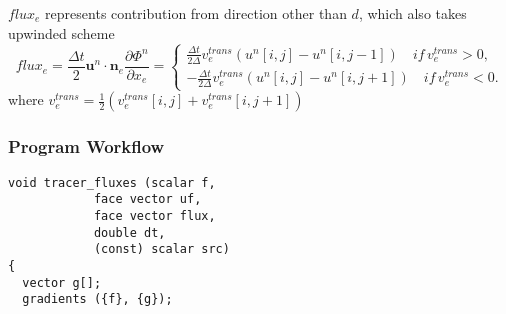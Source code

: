\documentclass[a4paper]{article}
\newcommand{\para}[1]{\textbf{\emph{\textcolor{para}{#1}}}}
\begin{document}
$flux_e$ represents contribution from direction other than $d$, which also takes upwinded scheme
\begin{equation}
    flux_e = \frac{\Delta t}{2} \mathbf{u}^n\cdot\mathbf{n}_e \frac{\partial \Phi^n}{\partial x_e}=\left \{ 
    \begin{array}{cc}
      \frac{\Delta t}{2\Delta} v_{e}^{trans}(u^n[i,j]-u^n[i,j-1])\quad if\,v_{e}^{trans}>0,\\
      -\frac{\Delta t}{2\Delta} v_e^{trans}(u^n[i,j]-u^n[i,j+1])\quad if\,v_e^{trans}<0.
    \end{array}
    \right.
\end{equation}
where $v_e^{trans} = \frac{1}{2}(v_e^{trans}[i,j]+v_e^{trans}[i,j+1])$
\subsubsection{Program Workflow}
\begin{multicols}{2}
 \columnbreak
 \begin{verbatim}
void tracer_fluxes (scalar f,
		    face vector uf,
		    face vector flux,
		    double dt,
		    (const) scalar src)
{
  vector g[];
  gradients ({f}, {g});
 \end{verbatim}
 
\end{multicols}

\begin{center}
\end{center}
\end{document}
